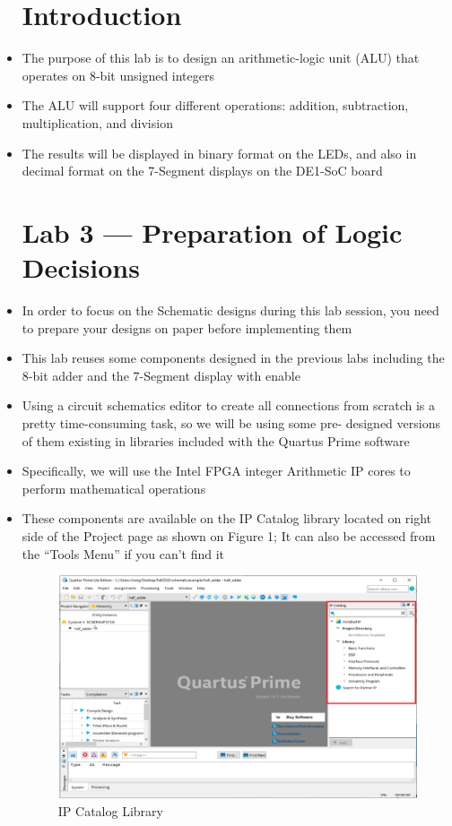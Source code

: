 \begin{itemize}

    \section{Introduction}

  \item The purpose of this lab is to design an arithmetic-logic unit (ALU) that operates on 8-bit unsigned integers
    
  \item The ALU will support four different operations: addition, subtraction, multiplication, and division 

  \item The results will be displayed in binary format on the LEDs, and also in decimal format on the 7-Segment displays on the DE1-SoC board

    \section{Lab 3 — Preparation of Logic Decisions}

  \item In order to focus on the Schematic designs during this lab session, you need to prepare your designs on paper before implementing them

  \item This lab reuses some components designed in the previous labs including the 8-bit adder and the 7-Segment display with enable

  \item Using a circuit schematics editor to create all connections from scratch is a pretty time-consuming task, so we will be using some pre- designed versions of them existing in libraries included with the Quartus Prime software

  \item Specifically, we will use the Intel FPGA integer Arithmetic IP cores to perform mathematical operations

  \item These components are available on the IP Catalog library located on right side of the Project page as shown on Figure 1; It can also be accessed from the ``Tools Menu'' if you can’t find it

    \begin{figure}[h!]
      \centering
      \includegraphics[width=.675\textwidth]{Figures/QPLPP.png}
      \caption{IP Catalog Library}
      \label{fig:1}
    \end{figure}


\end{itemize}
